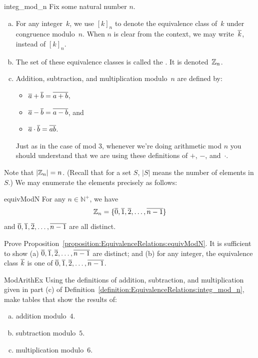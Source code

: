 \begin{defn}{integ_mod_n}
Fix some natural number $n$.
\begin{enumerate}[(a)]
\item For any integer~$k$, we use $[k]_n$ to denote the equivalence class of~$k$ under congruence modulo~$n$. When $n$ is clear from the context, we may write~$\overline{k}$, instead of $[k]_n$.
\item The set of these equivalence classes is called the . It is denoted~$\mathbb{Z}_n$.

 \item Addition, subtraction, and multiplication modulo~$n$ are defined by:
\begin{itemize}
\item $\overline{a} \mathbin{+} \overline{b} = \overline{a + b}$,
\item $\overline{a} \mathbin{-} \overline{b} = \overline{a - b}$,
and
\item $\overline{a} \cdot \overline{b} = \overline{a  b}$.
\end{itemize}
Just as in the case of mod 3, whenever we're doing arithmetic mod $n$ you should understand that we are using these definitions of  $+$, $-$, and~$\cdot$.
\end{enumerate}
\end{defn}


Note that $\left|\mathbb{Z}_n \right| = n$. (Recall that for a set $S$, $|S|$ means the number of elements in $S$.) We may enumerate the elements precisely as follows:

\begin{prop}{equivModN}
For any $n \in \mathbb{N}^+$, we have 
	$$\mathbb{Z}_n = \{ \overline{0}, \overline{1}, \overline{2}, \ldots, \overline{n-1} \}$$
and $\overline{0}, \overline{1}, \overline{2}, \ldots, \overline{n-1}$ are all distinct.
\end{prop}

\begin{exercise}{}
Prove Proposition~\ref{proposition:EquivalenceRelations:equivModN}.  It is sufficient to show (a) $\overline{0}, \overline{1}, \overline{2}, \ldots, \overline{n-1} $ are distinct; and (b) for any integer, the  equivalence class $\overline{k}$ is one of $\overline{0}, \overline{1}, \overline{2}, \ldots, \overline{n-1} $.
\end{exercise}

\begin{exercise}{ModArithEx}  
Using the definitions of addition, subtraction, and multiplication given in part (c) of Definition~\ref{definition:EquivalenceRelations:integ_mod_n}, make tables that show the results of:
\begin{enumerate}[(a)]
\item \label{ModArithEx-tables-addition} 
addition modulo~$4$.
\item \label{ModArithEx-tables-subtraction} 
subtraction modulo~$5$.
\item \label{ModArithEx-tables-multiplication} 
multiplication modulo~$6$.
\end{enumerate}
\end{exercise}

